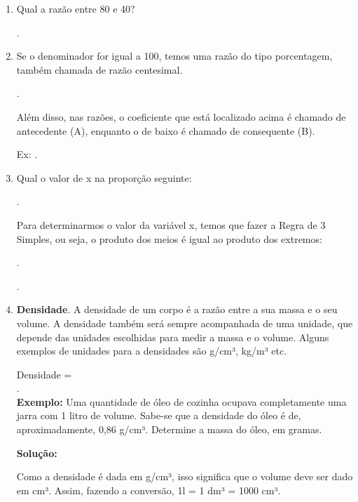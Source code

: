\begin{multicols*}{2}
\begin{enumerate}
		\item Qual a razão entre 80 e 40?

		      .

		\item Se o denominador for igual a 100, temos uma razão do tipo porcentagem, também chamada de razão centesimal.

		      .

		      Além disso, nas razões, o coeficiente que está localizado acima é chamado de antecedente (A), enquanto o de baixo é chamado de consequente (B).

		      Ex: .

		\item Qual o valor de x na proporção seguinte:

		      .

		      Para determinarmos o valor da variável x, temos que fazer a Regra de 3 Simples, ou seja, o produto dos meios é igual ao produto dos extremos:

		      .

		      .

		\item \textbf{Densidade}. A densidade de um corpo é a razão entre a sua massa e o seu volume. A densidade também será sempre acompanhada de uma unidade, que depende das unidades escolhidas para medir a massa e o volume. Alguns exemplos de unidades para a densidades são g/cm³, kg/m³ etc.

		      Densidade = \\

		      .\\

		      \textbf{Exemplo:} Uma quantidade de óleo de cozinha ocupava completamente uma jarra com 1 litro de volume. Sabe-se que a densidade do óleo é de, aproximadamente, 0,86 g/cm³.  Determine a massa do óleo, em gramas.

		      \textbf{Solução:}

		      Como a densidade é dada em g/cm³, isso significa que o volume deve ser dado em cm³. Assim, fazendo a conversão, 1l = 1 dm³ = 1000 cm³.


\end{enumerate}
\end{multicols*}
